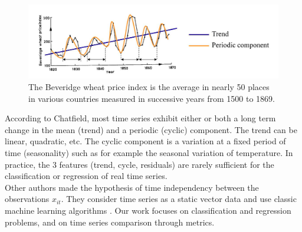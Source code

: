 \begin{figure}[h!]
	\centering
	\includegraphics[width=1\linewidth]{images/time_series_example}
	\caption{The Beveridge wheat price index is the average in nearly 50 places in various countries measured in successive years from 1500 to 1869\protect\footnotemark.}
	\label{fig:time_series_example}
\end{figure}

\noindent According to Chatfield, most time series exhibit either or both a long term change in the mean (trend) and a periodic (cyclic) component. The trend can be linear, quadratic, etc. The cyclic component is a variation at a fixed period of time (seasonality) such as for example the seasonal variation of temperature. In practice, the 3 features (trend, cycle, residuals) are rarely sufficient for the classification or regression of real time series. \\

Other authors made the hypothesis of time independency between the observations $x_{it}$. They consider time series as a static vector data and use classic machine learning algorithms \cite{Liang2012,Cao2001,Hu2013,Hwang2012}. Our work focuses on classification and regression problems, and on time series comparison through metrics.





